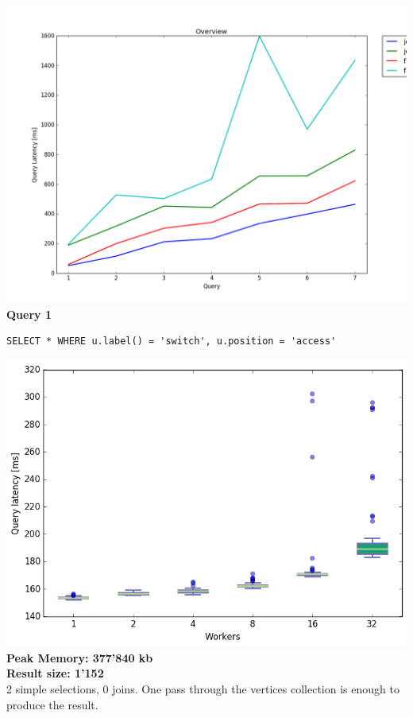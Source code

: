\documentclass[11pt,singlecolumn]{scrartcl}
\begin{document}
\includegraphics[width=1\textwidth]{overview3}
\textbf{Query 1}\\
\begin{verbatim}
SELECT * WHERE u.label() = 'switch', u.position = 'access'
\end{verbatim}
\includegraphics[width=1\textwidth]{box/q1}
\textbf{Peak Memory: 377'840 kb}\\
\textbf{Result size: 1'152} \\
2 simple selections, 0 joins. One pass through the vertices collection is enough to produce the result.
\clearpage
\end{document}
